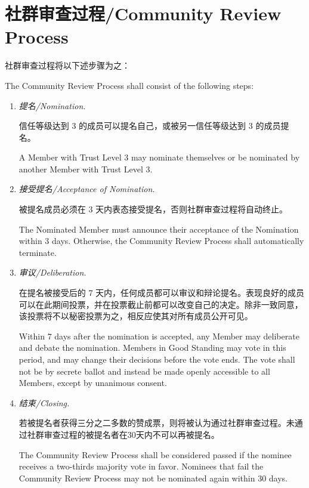 \documentclass[12pt]{aspasia-constitution}
\begin{document}
	\section{社群审查过程/Community Review Process}  \label{sec:communityreview}
	
	社群审查过程将以下述步骤为之：
	
	The Community Review Process shall consist of the following steps:
	
	\begin{enumerate}[leftmargin=1.25cm]
		\item \textit{提名/Nomination.} \par\vspace{3pt}
		信任等级达到 3 的成员可以提名自己，或被另一信任等级达到 3 的成员提名。\par
		A Member with Trust Level 3 may nominate themselves or be nominated by another Member with Trust Level 3.
		\item \textit{接受提名/Acceptance of Nomination.} \par\vspace{3pt}
		被提名成员必须在 3 天内表态接受提名，否则社群审查过程将自动终止。\par
		The Nominated Member must announce their acceptance of the Nomination within 3 days. Otherwise, the Community Review Process shall automatically terminate.
		\item \textit{审议/Deliberation.} \par\vspace{3pt}
		在提名被接受后的 7 天内，任何成员都可以审议和辩论提名。表现良好的成员可以在此期间投票，并在投票截止前都可以改变自己的决定。除非一致同意，该投票将不以秘密投票为之，相反应使其对所有成员公开可见。\par
		Within 7 days after the nomination is accepted, any Member may deliberate and debate the nomination. Members in Good Standing may vote in this period, and may change their decisions before the vote ends. The vote shall not be by secrete ballot and instead be made openly accessible to all Members, except by unanimous consent.
		\item \textit{结束/Closing.} \par\vspace{3pt}
		若被提名者获得三分之二多数的赞成票，则将被认为通过社群审查过程。未通过社群审查过程的被提名者在30天内不可以再被提名。\par
		The Community Review Process shall be considered passed if the nominee receives a two-thirds majority vote in favor. Nominees that fail the Community Review Process may not be nominated again within 30 days.
	\end{enumerate}
	
\end{document}

